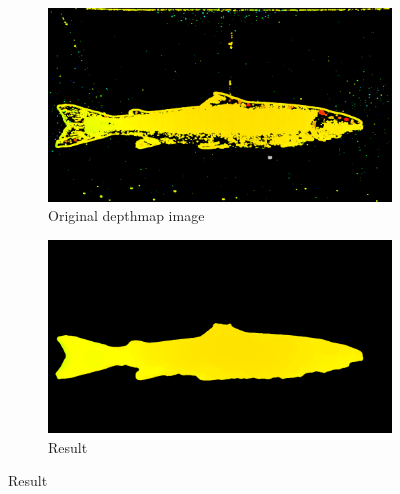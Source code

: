\begin{figure}[H]
    \medskip
    \begin{subfigure}{0.48\textwidth}
        \includegraphics[width=\linewidth]{images/implementation/algorithm_test/original_82}
        \caption{Original depthmap image} 
        \label{fig:original_depthmap_82}
    \end{subfigure}\hspace*{\fill}
    \begin{subfigure}{0.48\textwidth}
        \includegraphics[width=\linewidth]{images/implementation/algorithm_test/median_filter_63}
        \caption{Result} 
        \label{fig:result_82}
    \end{subfigure}
    

\end{figure}
